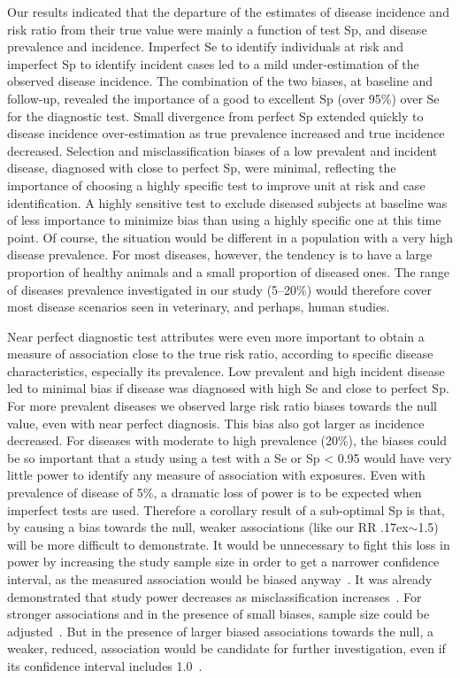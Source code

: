 Our results indicated that the departure of the estimates of disease incidence
and risk ratio from their true value were mainly a function of test Sp, and
disease prevalence and incidence.
Imperfect Se to identify individuals at risk and imperfect Sp to identify
incident cases led to a mild under-estimation of the observed disease incidence.
The combination of the two biases, at baseline and follow-up, revealed the
importance of a good to excellent Sp (over 95\%) over Se for the diagnostic
test.
Small divergence from perfect Sp extended quickly to disease incidence
over-estimation as true prevalence increased and true incidence decreased.
Selection and misclassification biases of a low prevalent and incident
disease, diagnosed with close to perfect Sp, were minimal, reflecting the
importance of choosing a highly specific test to improve unit at risk and case
identification.
A highly sensitive test to exclude diseased subjects at baseline was of less
importance to minimize bias than using a highly specific one at this time point.
Of course, the situation would be different in a population with a very high
disease prevalence.
For most diseases, however, the tendency is to have a large proportion of
healthy animals and a small proportion of diseased ones.
The range of diseases prevalence investigated in our study (5--20\%) would
therefore cover most disease scenarios seen in veterinary, and perhaps, human
studies.

Near perfect diagnostic test attributes were even more important to obtain a
measure of association close to the true risk ratio, according to specific
disease characteristics, especially its prevalence.
Low prevalent and high incident disease led to minimal bias if disease was
diagnosed with high Se and close to perfect Sp.
For more prevalent diseases we observed large risk ratio biases towards the
null value, even with near perfect diagnosis.
This bias also got larger as incidence decreased.
For diseases with moderate to high prevalence (20\%), the biases could be so
important that a study using a test with a Se or Sp < 0.95
would have very little power to identify any measure of association with
exposures.
Even with prevalence of disease of 5\%, a dramatic loss of power is to be
expected when imperfect tests are used.
Therefore a corollary result of a sub-optimal Sp is that, by causing a bias
towards the null, weaker associations (like our RR
\raise.17ex\hbox{$\scriptstyle\sim$}\num{1.5}) will be more difficult to
demonstrate.
It would be unnecessary to fight this loss in power by increasing the study
sample size in order to get a narrower confidence interval, as the measured
association would be biased anyway~\citep{Brenner_1990}.
It was already demonstrated that study power decreases as misclassification
increases~\citep{Brown_2010}.
For stronger associations and in the presence of small biases, sample size could
be adjusted~\citep{Dendukuri_2004,Cheng_2009}.
But in the presence of larger biased associations towards the null, a weaker,
reduced, association would be candidate for further investigation, even if its
confidence interval includes \num{1.0}~\citep{Baird_1991}.

